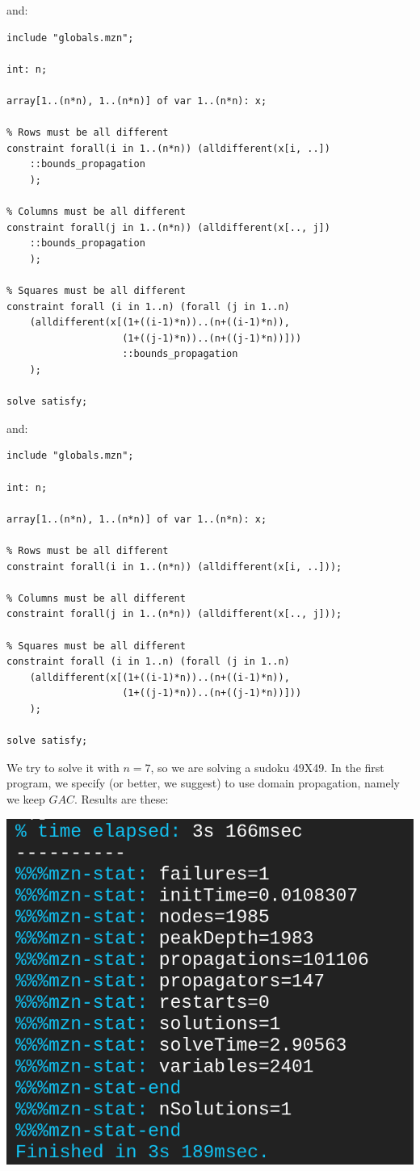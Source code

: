 \documentclass[10pt,a4paper]{article}
\begin{document}
and:

\begin{lstlisting}[style=none]
include "globals.mzn";

int: n;

array[1..(n*n), 1..(n*n)] of var 1..(n*n): x;

% Rows must be all different
constraint forall(i in 1..(n*n)) (alldifferent(x[i, ..])
    ::bounds_propagation
    );

% Columns must be all different
constraint forall(j in 1..(n*n)) (alldifferent(x[.., j])
    ::bounds_propagation
    );

% Squares must be all different
constraint forall (i in 1..n) (forall (j in 1..n)
	(alldifferent(x[(1+((i-1)*n))..(n+((i-1)*n)),
                    (1+((j-1)*n))..(n+((j-1)*n))]))
                    ::bounds_propagation
	);

solve satisfy;
\end{lstlisting}

and:
\pagebreak

\begin{lstlisting}[style=none]
include "globals.mzn";

int: n;

array[1..(n*n), 1..(n*n)] of var 1..(n*n): x;

% Rows must be all different
constraint forall(i in 1..(n*n)) (alldifferent(x[i, ..]));

% Columns must be all different
constraint forall(j in 1..(n*n)) (alldifferent(x[.., j]));

% Squares must be all different
constraint forall (i in 1..n) (forall (j in 1..n)
	(alldifferent(x[(1+((i-1)*n))..(n+((i-1)*n)),
                    (1+((j-1)*n))..(n+((j-1)*n))]))
	);

solve satisfy;
\end{lstlisting}

We try to solve it with $n = 7$, so we are solving a sudoku 49X49. In the
first program, we specify (or better, we suggest) to use domain propagation,
namely we keep $GAC$. Results are these:

\includegraphics[scale=0.2]{sudoku_res.png}
\end{document}
